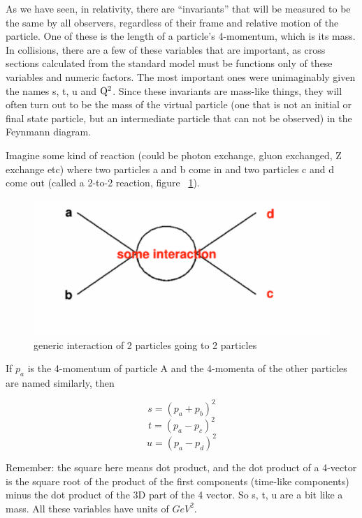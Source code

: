 As we have seen, in relativity, there are ``invariants'' that will be 
measured to be the same by all observers, regardless of 
their frame and relative motion of the particle.  One of these is the length of a particle's 
4-momentum, which is its mass.  In collisions, there are a few of these variables that are important, as cross sections calculated from the standard model must be functions only of these variables and numeric factors.  The most important ones were unimaginably given the names s, t, u and 
${\rm Q^2}$.  Since these invariants are mass-like things, they will often turn out to 
be the mass of the virtual particle (one that is not an initial or final state particle, but
an intermediate particle that can not be observed) in the Feynmann diagram.

  
Imagine some kind of reaction (could be photon exchange, gluon exchanged, Z exchange etc) where two particles a and b come in and two particles c and d come out  (called a 2-to-2 reaction, figure ~\ref{fig:twototwo}).

\begin{figure}[h]
\centering\includegraphics[scale=0.5]{./protonprotoncollisions/Pictures/fig1.pdf}
\caption{generic interaction of 2 particles going to 2 particles}
\label{fig:twototwo}
\end{figure}

If \(p_{a}\) is the 4-momentum of particle A and the 4-momenta of the other particles are named similarly, then

\begin{equation}s=(p_{a}+p_{b})^{2}\end{equation}
\begin{equation}t=(p_{a}-p_{c})^{2}\end{equation}
\begin{equation}u=(p_{a}-p_{d})^{2}\end{equation}

Remember: the square here means dot product, and the dot product of a 4-vector is the square root of the product of the first components (time-like components) minus the dot product of the 3D part of the 4 vector.  So s, t, u are a bit like a mass.  All these variables have units of \(GeV^{2}\).

